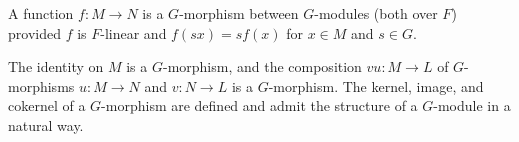 A function $f: M \rightarrow N$ is a $G$-morphism between $G$-modules (both over $F$) provided $f$ is $F$-linear and $f(sx) = sf(x)$ for $x \in M$ and $s \in G$.

The identity on $M$ is a $G$-morphism, and the composition $vu: M \rightarrow L$ of $G$-morphisms $u: M \rightarrow N$ and $v: N \rightarrow L$ is a $G$-morphism. The kernel, image, and cokernel of a $G$-morphism are defined and admit the structure of a $G$-module in a natural way.

